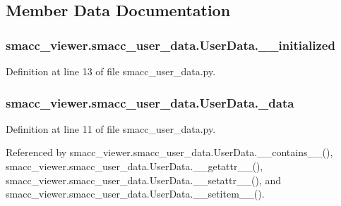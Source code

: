 \subsection{Member Data Documentation}
\subsubsection[{\texorpdfstring{\+\_\+\+\_\+initialized}{__initialized}}]{\setlength{\rightskip}{0pt plus 5cm}smacc\+\_\+viewer.\+smacc\+\_\+user\+\_\+data.\+User\+Data.\+\_\+\+\_\+initialized\hspace{0.3cm}{\ttfamily [private]}}\hypertarget{classsmacc__viewer_1_1smacc__user__data_1_1UserData_a05765f72e17ffc196fca63bc6829db59}{}\label{classsmacc__viewer_1_1smacc__user__data_1_1UserData_a05765f72e17ffc196fca63bc6829db59}


Definition at line 13 of file smacc\+\_\+user\+\_\+data.\+py.

\subsubsection[{\texorpdfstring{\+\_\+data}{_data}}]{\setlength{\rightskip}{0pt plus 5cm}smacc\+\_\+viewer.\+smacc\+\_\+user\+\_\+data.\+User\+Data.\+\_\+data\hspace{0.3cm}{\ttfamily [private]}}\hypertarget{classsmacc__viewer_1_1smacc__user__data_1_1UserData_a046fa6b42f6a4a6c4c013c951c78e42f}{}\label{classsmacc__viewer_1_1smacc__user__data_1_1UserData_a046fa6b42f6a4a6c4c013c951c78e42f}


Definition at line 11 of file smacc\+\_\+user\+\_\+data.\+py.



Referenced by smacc\+\_\+viewer.\+smacc\+\_\+user\+\_\+data.\+User\+Data.\+\_\+\+\_\+contains\+\_\+\+\_\+(), smacc\+\_\+viewer.\+smacc\+\_\+user\+\_\+data.\+User\+Data.\+\_\+\+\_\+getattr\+\_\+\+\_\+(), smacc\+\_\+viewer.\+smacc\+\_\+user\+\_\+data.\+User\+Data.\+\_\+\+\_\+setattr\+\_\+\+\_\+(), and smacc\+\_\+viewer.\+smacc\+\_\+user\+\_\+data.\+User\+Data.\+\_\+\+\_\+setitem\+\_\+\+\_\+().


